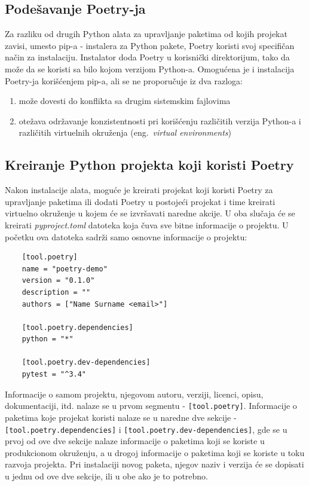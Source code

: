 \documentclass[12pt]{report}
\begin{document}
\subsection{Podešavanje Poetry-ja}
Za razliku od drugih Python alata za upravljanje paketima od kojih projekat zavisi, umesto pip-a - instalera za Python pakete, Poetry koristi svoj specifičan način za instalaciju. Instalator doda Poetry u korisnički direktorijum, tako da može da se koristi sa bilo kojom verzijom Python-a. Omogućena je i instalacija Poetry-ja korišćenjem pip-a, ali se ne proporučuje iz dva razloga:

\begin{enumerate}
    \item može dovesti do konflikta sa drugim sistemskim fajlovima
    \item otežava održavanje konzistentnosti pri korišćenju različitih verzija Python-a i različitih virtuelnih okruženja (eng.\ \textit{virtual environments})
\end{enumerate}

\subsection{Kreiranje Python projekta koji koristi Poetry}
Nakon instalacije alata, moguće je kreirati projekat koji koristi Poetry za upravljanje paketima ili dodati Poetry u postojeći projekat i time kreirati virtuelno okruženje u kojem će se izvršavati naredne akcije. U oba slučaja će se kreirati \textit{pyproject.toml} datoteka koja čuva sve bitne informacije o projektu. U početku ova datoteka sadrži samo osnovne informacije o projektu:

\begin{samepage}
    \begin{verbatim}
    [tool.poetry]
    name = "poetry-demo"
    version = "0.1.0"
    description = ""
    authors = ["Name Surname <email>"]

    [tool.poetry.dependencies]
    python = "*"

    [tool.poetry.dev-dependencies]
    pytest = "^3.4"
    \end{verbatim}
\end{samepage}

Informacije o samom projektu, njegovom autoru, verziji, licenci, opisu, dokumentaciji, itd. nalaze se u prvom segmentu - \texttt{[tool.poetry]}. Informacije o paketima koje projekat koristi nalaze se u naredne dve sekcije - \texttt{[tool.poetry.dependencies]} i \texttt{[tool.poetry.dev-dependencies]}, gde se u prvoj od ove dve sekcije nalaze informacije o paketima koji se koriste u produkcionom okruženju, a u drogoj informacije o paketima koji se koriste u toku razvoja projekta. Pri instalaciji novog paketa, njegov naziv i verzija će se dopisati u jednu od ove dve sekcije, ili u obe ako je to potrebno.
\end{document}
